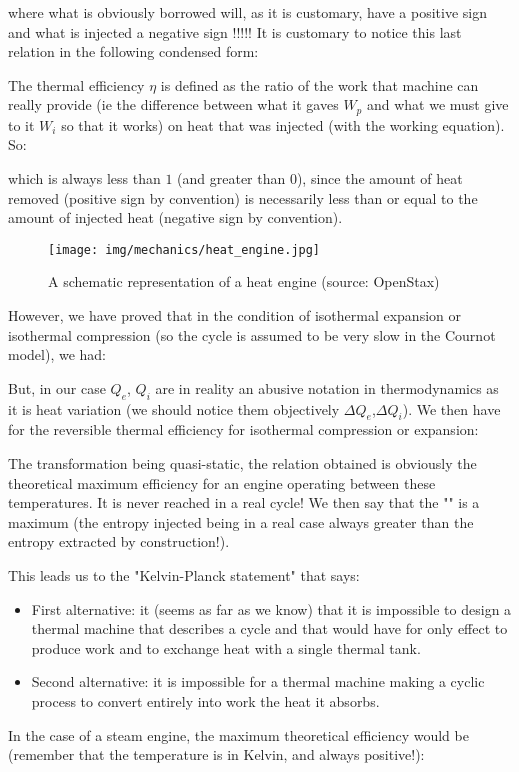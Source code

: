 	where what is obviously borrowed will, as it is customary, have a positive sign and what is injected a negative sign !!!!! It is customary to notice this last relation in the following condensed form:
	
	The thermal efficiency $\eta$ is defined as the ratio of the work that machine can really provide (ie the difference between what it gaves $W_p$ and what we must give to it $W_i$ so that it works) on heat that was injected (with the working equation). So:
	
	which is always less than $1$ (and greater than $0$), since the amount of heat removed (positive sign by convention) is necessarily less than or equal to the amount of injected heat (negative sign by convention). 
	\begin{figure}[H]
		\centering
		\texttt{[image: img/mechanics/heat\_engine.jpg]}
		\caption{A schematic representation of a heat engine (source: OpenStax)}
	\end{figure}
	However, we have proved that in the condition of isothermal expansion or isothermal compression (so the cycle is assumed to be very slow in the Cournot model), we had:
	
	But, in our case $Q_e$, $Q_i$ are in reality an abusive notation in thermodynamics as it is heat variation (we should notice them objectively $\Delta Q_e$,$\Delta Q_i$). We then have for the reversible  thermal efficiency for isothermal compression or expansion:
	
	The transformation being quasi-static, the relation obtained is obviously the theoretical maximum efficiency for an engine operating between these temperatures. It is never reached in a real cycle! We then say that the "" is a maximum (the entropy injected being in a real case always greater than the entropy extracted by construction!).

	This leads us to the "Kelvin-Planck statement" that says:
	\begin{itemize}
		\item First alternative: it (seems as far as we know) that it is impossible to design a thermal machine that describes a cycle and that would have for only effect to produce work and to exchange heat with a single thermal tank.

		\item Second alternative: it is impossible for a thermal machine making a cyclic process to convert entirely into work the heat it absorbs.
	\end{itemize}
	In the case of a steam engine, the maximum theoretical efficiency would be (remember that the temperature is in Kelvin, and always positive!):
	
